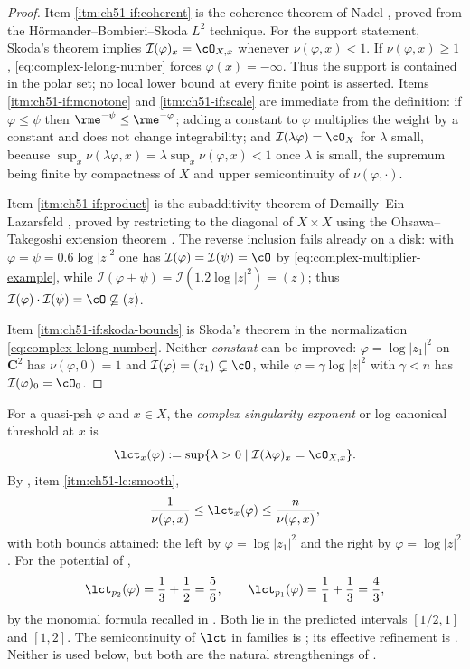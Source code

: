 \begin{proof}
Item \cref{itm:ch51-if:coherent} is the coherence theorem of Nadel
\cite{Nad90}, proved from the H\"ormander--Bombieri--Skoda
$L^2$ technique.  For the support statement, Skoda's theorem implies
$\mathcal I(\varphi)_x=\cO_{X,x}$ whenever $\nu(\varphi,x)<1$.
If $\nu(\varphi,x)\geq1$, \eqref{eq:complex-lelong-number} forces
$\varphi(x)=-\infty$.  Thus the support is contained in the polar set;
no local lower bound at every finite point is asserted.  Items \cref{itm:ch51-if:monotone} and
\cref{itm:ch51-if:scale} are immediate from the definition: if
$\varphi\leq\psi$ then $\rme^{-\psi}\leq\rme^{-\varphi}$; adding a
constant to $\varphi$ multiplies the weight by a constant and does not
change integrability; and $\mathcal I(\lambda\varphi)=\cO_X$ for
$\lambda$ small, because $\sup_x\nu(\lambda\varphi,x)
=\lambda\sup_x\nu(\varphi,x)<1$ once $\lambda$ is small, the supremum
being finite by compactness of $X$ and upper semicontinuity of
$\nu(\varphi,\cdot)$.

Item \cref{itm:ch51-if:product} is the subadditivity theorem of
Demailly--Ein--Lazarsfeld \cite{DEL00}, proved by restricting to the
diagonal of $X\times X$ using the Ohsawa--Takegoshi extension theorem
\cite{OT87}.  The reverse inclusion fails already on a disk: with
$\varphi=\psi=0.6\log|z|^2$ one has
$\mathcal I(\varphi)=\mathcal I(\psi)=\cO$ by
\eqref{eq:complex-multiplier-example}, while
$\mathcal I(\varphi+\psi)=\mathcal I(1.2\log|z|^2)=(z)$; thus
$\mathcal I(\varphi)\cdot\mathcal I(\psi)=\cO\not\subseteq(z)$.

Item \cref{itm:ch51-if:skoda-bounds} is Skoda's theorem \cite{Sko72} in the
normalization \eqref{eq:complex-lelong-number}.  Neither \emph{constant}
can be improved: $\varphi=\log|z_1|^2$ on
$\mathbf C^2$ has $\nu(\varphi,0)=1$ and
$\mathcal I(\varphi)=(z_1)\subsetneq\cO$, while
$\varphi=\gamma\log|z|^2$ with $\gamma<n$ has
$\mathcal I(\varphi)_0=\cO_0$.
\end{proof}

\begin{example}
\label{ex:ch51-lct}
For a quasi-psh $\varphi$ and $x\in X$, the \emph{complex singularity
exponent} or log canonical threshold at $x$ is
\[
 \lct_x(\varphi)
 :=\sup\{\lambda>0\mid \mathcal I(\lambda\varphi)_x=\cO_{X,x}\}.
\]
By , item \cref{itm:ch51-lc:smooth},
\[
 \frac{1}{\nu(\varphi,x)}\leq\lct_x(\varphi)\leq
 \frac{n}{\nu(\varphi,x)},
\]
with both bounds attained: the left by $\varphi=\log|z_1|^2$ and the
right by $\varphi=\log|z|^2$.  For the potential of
,
\[
 \lct_{p_2}(\varphi)=\frac13+\frac12=\frac56,
 \qquad
 \lct_{p_1}(\varphi)=\frac11+\frac13=\frac43 ,
\]
by the monomial formula recalled in .  Both lie in
the predicted intervals $[1/2,1]$ and $[1,2]$.  The
semicontinuity of $\lct$ in families is \cite{DK01}; its
effective refinement is \cite{Hiep14}.  Neither is used below, but both
are the natural strengthenings of .
\end{example}

